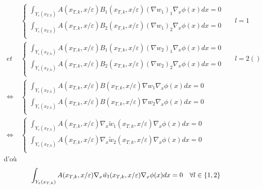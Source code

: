 \documentclass[11pt]{article}
\newcommand{\Ye}{Y_\varepsilon}
\newcommand{\tw}{\tilde{w}}
\begin{document}
\begin{equation}
  \begin{aligned}
    &\begin{cases}
      \int_{\Ye(x_{T,k})} A(x_{T,k}, x/\varepsilon) B_1(x_{T,k}, x/\varepsilon) (\nabla w_1)_1 \nabla_x \phi(x) dx = 0 \\
      \int_{\Ye(x_{T,k})} A(x_{T,k}, x/\varepsilon) B_2(x_{T,k}, x/\varepsilon) (\nabla w_1)_2 \nabla_x \phi(x) dx = 0 \\
    \end{cases} && l=1\\
    et~~ &\begin{cases}
      \int_{\Ye(x_{T,k})} A(x_{T,k}, x/\varepsilon)B_1(x_{T,k}, x/\varepsilon) (\nabla w_2)_1 \nabla_x \phi(x) dx = 0 \\
      \int_{\Ye(x_{T,k})} A(x_{T,k}, x/\varepsilon)B_2(x_{T,k}, x/\varepsilon) (\nabla w_2)_2 \nabla_x \phi(x) dx = 0 \\ 
    \end{cases} && l=2()\\
    \iff &\begin{cases}
      \int_{\Ye(x_{T,k})} A(x_{T,k}, x/\varepsilon)B(x_{T,k}, x/\varepsilon) \nabla w_1 \nabla_x \phi(x) dx = 0 \\
      \int_{\Ye(x_{T,k})} A(x_{T,k}, x/\varepsilon)B(x_{T,k}, x/\varepsilon) \nabla w_2 \nabla_x \phi(x) dx = 0 \\ 
    \end{cases} \\
    \iff &\begin{cases}
      \int_{\Ye(x_{T,k})} A(x_{T,k}, x/\varepsilon)\nabla_x \tw_1(x_{T,k}, x/\varepsilon) \nabla_x \phi(x) dx = 0 \\
      \int_{\Ye(x_{T,k})} A(x_{T,k}, x/\varepsilon)\nabla_x \tw_2(x_{T,k}, x/\varepsilon) \nabla_x \phi(x) dx = 0 \\ 
    \end{cases}
  \end{aligned}
\end{equation}
d'où 
\begin{equation}
  \label{eq:pbcelltw}
  \int_{\Ye(x_{T,k})} A(x_{T,k}, x/\varepsilon)\nabla_x \tw_l(x_{T,k}, x/\varepsilon) \nabla_x \phi(x) dx = 0 \quad \forall l \in \{1,2\}\\
\end{equation}                                       
\end{document}
